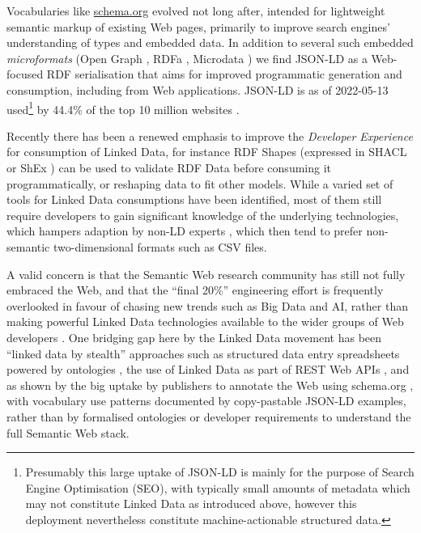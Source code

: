 \documentclass[fleqn,10pt,lineno]{wlpeerjlua}
\begin{document}
Vocabularies like \href{https://schema.org/}{schema.org} evolved not long after, intended for lightweight semantic markup of existing Web pages, primarily to improve search engines' understanding of types and embedded data. In addition to several such embedded \emph{microformats} (Open Graph \autocite{OpenGraphProtocol}, RDFa \autocite{w3-rdfa-primer}, Microdata \autocite{HTMLStandard}) we find JSON-LD \autocite{w3-json-ld} as a Web-focused RDF serialisation that aims for improved programmatic generation and consumption, including from Web applications. JSON-LD is as of 2022-05-13 used\footnote{Presumably this large uptake of JSON-LD is mainly for the purpose of Search Engine Optimisation (SEO), with typically small amounts of metadata which may not constitute Linked Data as introduced above, however this deployment nevertheless constitute machine-actionable structured data.} by 44.4\% of the top 10 million websites \autocite{UsageStatisticsJSONLD}.

Recently there has been a renewed emphasis to improve the \emph{Developer Experience} \autocite{DesigningLinkedData2018} for consumption of Linked Data, for instance RDF Shapes (expressed in SHACL \autocite{w3-shacl} or ShEx \autocite{ShapeExpressionsShEx}) can be used to validate RDF Data \autocite{gayoValidatingRDFData2017a,thorntonUsingShapeExpressions2019a} before consuming it programmatically, or reshaping data to fit other models. While a varied set of tools for Linked Data consumptions have been identified, most of them still require developers to gain significant knowledge of the underlying technologies, which hampers adaption by non-LD experts \autocite{klimekSurveyToolsLinked2019a}, which then tend to prefer non-semantic two-dimensional formats such as CSV files.

A valid concern is that the Semantic Web research community has still not fully embraced the Web, and that the ``final 20\%'' engineering effort is frequently overlooked in favour of chasing new trends such as Big Data and AI, rather than making powerful Linked Data technologies available to the wider groups of Web developers \autocite{verborghSemanticWebIdentity2020a}. One bridging gap here by the Linked Data movement has been ``linked data by stealth'' approaches such as structured data entry spreadsheets powered by ontologies \autocite{wolstencroftRightFieldEmbeddingOntology2011b}, the use of Linked Data as part of REST Web APIs \autocite{pageRESTLinkedData2011}, and as shown by the big uptake by publishers to annotate the Web using schema.org \autocite{bernsteinNewLookSemantic2016a}, with vocabulary use patterns documented by copy-pastable JSON-LD examples, rather than by formalised ontologies or developer requirements to understand the full Semantic Web stack.
\end{document}

